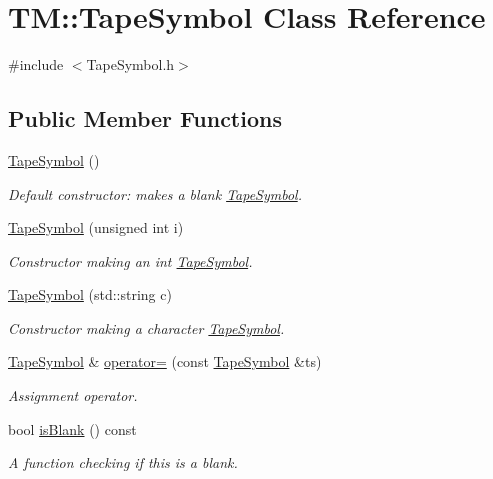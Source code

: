 \hypertarget{classTM_1_1TapeSymbol}{\section{\-T\-M\-:\-:\-Tape\-Symbol \-Class \-Reference}
\label{d8/d62/classTM_1_1TapeSymbol}
}


{\ttfamily \#include $<$\-Tape\-Symbol.\-h$>$}

\subsection*{\-Public \-Member \-Functions}
\begin{DoxyCompactItemize}
\item 
\hyperlink{classTM_1_1TapeSymbol_a2766ff5c8be461a1936e422dbc21e266}{\-Tape\-Symbol} ()
\begin{DoxyCompactList}\small\item\em \-Default constructor\-: makes a blank \hyperlink{classTM_1_1TapeSymbol}{\-Tape\-Symbol}. \end{DoxyCompactList}\item 
\hyperlink{classTM_1_1TapeSymbol_a5f3591fae790d4eb2e8e209eb727ac0b}{\-Tape\-Symbol} (unsigned int i)
\begin{DoxyCompactList}\small\item\em \-Constructor making an int \hyperlink{classTM_1_1TapeSymbol}{\-Tape\-Symbol}. \end{DoxyCompactList}\item 
\hyperlink{classTM_1_1TapeSymbol_abc65d6f09ccdfa19cfbfc14772dd9068}{\-Tape\-Symbol} (std\-::string c)
\begin{DoxyCompactList}\small\item\em \-Constructor making a character \hyperlink{classTM_1_1TapeSymbol}{\-Tape\-Symbol}. \end{DoxyCompactList}\item 
\hyperlink{classTM_1_1TapeSymbol}{\-Tape\-Symbol} \& \hyperlink{classTM_1_1TapeSymbol_ae71634efcc0f0ca8c8d02d3f2b59a76c}{operator=} (const \hyperlink{classTM_1_1TapeSymbol}{\-Tape\-Symbol} \&ts)
\begin{DoxyCompactList}\small\item\em \-Assignment operator. \end{DoxyCompactList}\item 
bool \hyperlink{classTM_1_1TapeSymbol_a303e737aa42371bd09e85407e36fed56}{is\-Blank} () const 
\begin{DoxyCompactList}\small\item\em \-A function checking if this is a blank. \end{DoxyCompactList}\end{DoxyCompactItemize}
